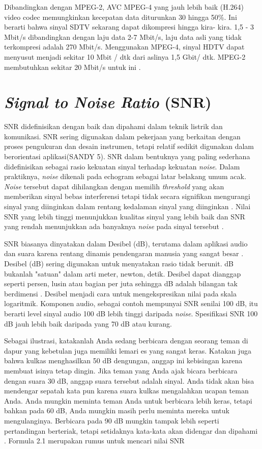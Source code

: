 Dibandingkan dengan MPEG-2, AVC MPEG-4 yang jauh lebih baik (H.264) video codec memungkinkan kecepatan data diturunkan 30 hingga 50\%. Ini berarti bahwa sinyal SDTV sekarang dapat dikompresi hingga kira- kira. 1,5 - 3 Mbit/s dibandingkan dengan laju data 2-7 Mbit/s, laju data asli yang tidak terkompresi adalah 270 Mbit/s. Menggunakan MPEG-4, sinyal HDTV dapat menyusut menjadi sekitar 10 Mbit / dtk dari aslinya 1,5 Gbit/ dtk. MPEG-2 membutuhkan sekitar 20 Mbit/s untuk ini \citep{Fischer2010}.


\section{\textit{Signal to Noise Ratio} (SNR)}
\hspace{1,2cm}SNR didefinisikan dengan baik dan dipahami dalam teknik listrik dan komunikasi. SNR sering digunakan dalam pekerjaan yang berkaitan dengan proses pengukuran dan desain instrumen, tetapi relatif sedikit digunakan dalam berorientasi aplikasi(SANDY 5). SNR dalam bentuknya yang paling sederhana didefinisikan sebagai rasio kekuatan sinyal terhadap kekuatan \textit{noise}. Dalam praktiknya, \textit{noise} dikenali pada echogram sebagai latar belakang umum acak. \textit{Noise} tersebut dapat dihilangkan dengan memilih \textit{threshold} yang akan memberikan sinyal bebas interferensi tetapi tidak secara signifikan mengurangi sinyal yang diinginkan dalam rentang kedalaman sinyal yang diinginkan \citep{Welvaert2013}. Nilai SNR yang lebih tinggi menunjukkan kualitas sinyal yang lebih baik dan SNR yang rendah menunjukkan ada banyaknya \textit{noise} pada sinyal tersebut \citep{Altunian2021}.

SNR biasanya dinyatakan dalam Desibel (dB), terutama dalam aplikasi audio dan suara karena rentang dinamis pendengaran manusia yang sangat besar \citep{Kessel2018}. Desibel (dB) sering digunakan untuk menyatakan rasio tidak berunit. dB bukanlah "satuan" dalam arti meter, newton, detik. Desibel dapat dianggap seperti persen, lusin atau bagian per juta sehingga dB adalah bilangan tak berdimensi \citep{Centauri2013}. Desibel menjadi cara untuk mengekspresikan nilai pada skala logaritmik. Komponen audio, sebagai contoh mempunyai SNR senilai 100 dB, itu berarti level sinyal audio 100 dB lebih tinggi daripada \textit{noise}. Spesifikasi SNR 100 dB jauh lebih baik daripada yang 70 dB atau kurang.

Sebagai ilustrasi, katakanlah Anda sedang berbicara dengan seorang teman di dapur yang kebetulan juga memiliki lemari es yang sangat keras. Katakan juga bahwa kulkas menghasilkan 50 dB dengungan, anggap ini kebisingan karena membuat isinya tetap dingin. Jika teman yang Anda ajak bicara berbicara dengan suara 30 dB, anggap suara tersebut adalah sinyal. Anda tidak akan bisa mendengar sepatah kata pun karena suara kulkas mengalahkan ucapan teman Anda. Anda mungkin meminta teman Anda untuk berbicara lebih keras, tetapi bahkan pada 60 dB, Anda mungkin masih perlu meminta mereka untuk mengulanginya. Berbicara pada 90 dB mungkin tampak lebih seperti pertandingan berteriak, tetapi setidaknya kata-kata akan didengar dan dipahami \citep{Altunian2021}. Formula 2.1 merupakan rumus untuk mencari nilai SNR \citep{Kieser2005}

